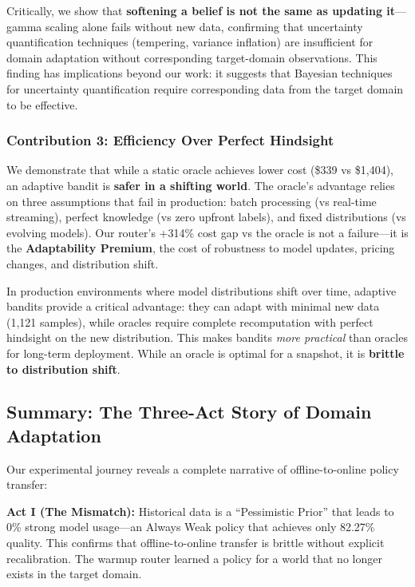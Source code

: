 Critically, we show that \textbf{softening a belief is not the same as updating it}—gamma scaling alone fails without new data, confirming that uncertainty quantification techniques (tempering, variance inflation) are insufficient for domain adaptation without corresponding target-domain observations. This finding has implications beyond our work: it suggests that Bayesian techniques for uncertainty quantification require corresponding data from the target domain to be effective.

\subsubsection{Contribution 3: Efficiency Over Perfect Hindsight}

We demonstrate that while a static oracle achieves lower cost (\$339 vs \$1,404), an adaptive bandit is \textbf{safer in a shifting world}. The oracle's advantage relies on three assumptions that fail in production: batch processing (vs real-time streaming), perfect knowledge (vs zero upfront labels), and fixed distributions (vs evolving models). Our router's +314\% cost gap vs the oracle is not a failure—it is the \textbf{Adaptability Premium}, the cost of robustness to model updates, pricing changes, and distribution shift.

In production environments where model distributions shift over time, adaptive bandits provide a critical advantage: they can adapt with minimal new data (1,121 samples), while oracles require complete recomputation with perfect hindsight on the new distribution. This makes bandits \emph{more practical} than oracles for long-term deployment. While an oracle is optimal for a snapshot, it is \textbf{brittle to distribution shift}.

\subsection{Summary: The Three-Act Story of Domain Adaptation}
\label{sec:summary}

Our experimental journey reveals a complete narrative of offline-to-online policy transfer:

\textbf{Act I (The Mismatch):} Historical data is a ``Pessimistic Prior'' that leads to 0\% strong model usage—an Always Weak policy that achieves only 82.27\% quality. This confirms that offline-to-online transfer is brittle without explicit recalibration. The warmup router learned a policy for a world that no longer exists in the target domain.

